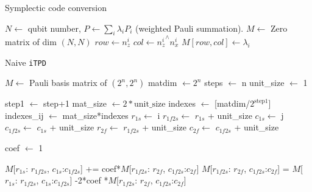 \documentclass[twocolumn]{article}
\begin{document}
\begin{algorithm}
    \caption{Symplectic code conversion}\label{alg:ppoly_to_Pauli basis}
    \begin{algorithmic}
        \Require $N \gets$ qubit number, $P \gets \sum_i \lambda_i P_i$ (weighted Pauli summation).
        \State $M \gets$ Zero matrix of dim $(N,N)$
            \State $row \gets n_z^i$
            \State $col \gets {n_z^i}^\wedge n_x^i$
            \State $M[row, col] \gets \lambda_i$
        \EndFor
    \end{algorithmic}
\end{algorithm}


\begin{algorithm}
    \caption{Naive \texttt{iTPD}}\label{alg:naive_inverse}
    \begin{algorithmic}
        \Require $M \gets$ Pauli basis matrix of $(2^n, 2^n)$
        \State matdim $\gets 2^n$
        \State steps $\gets$ n
        \State unit\_size $\gets$ 1

            \State step1 $\gets$ step+1
            \State mat\_size $\gets 2*\text{unit\_size}$
            \State indexes $\gets$ [matdim/$2^{\text{step1}}$]
            \State indexes\_ij $\gets$ mat\_size*indexes
                \State $r_{1s}\gets$ i
                \State $r_{1f2s}\gets$ $r_{1s}$ + unit\_size
                \State $c_{1s}\gets$ j
                \State $c_{1f2s}\gets$ $c_{1s}$ + unit\_size
                \State $r_{2f}\gets$ $r_{1f2s}$ + unit\_size
                \State $c_{2f}\gets$ $c_{1f2s}$ + unit\_size

                \State coef $\gets$ 1

                \State $M$[$r_{1s}$: $r_{1f2s}$, $c_{1s}$:$c_{1f2s}$] += coef*$M$[$r_{1f2s}$: $r_{2f}$, $c_{1f2s}$:$c_{2f}$]
                \State $M$[$r_{1f2s}$: $r_{2f}$, $c_{1f2s}$:$c_{2f}$] = $M$[$r_{1s}$: $r_{1f2s}$, $c_{1s}$:$c_{1f2s}$] -2*coef *$M$[$r_{1f2s}$: $r_{2f}$, $c_{1f2s}$:$c_{2f}$]


\end{algorithmic}
\end{algorithm}
\end{document}
